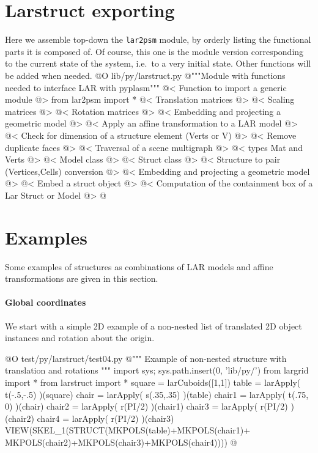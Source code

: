 \documentclass[11pt,oneside]{article}    %
\begin{document}
\section{Larstruct exporting}
\label{sec:larstruct}
Here we assemble top-down the \texttt{lar2psm} module, by orderly listing the functional parts it is composed of. Of course, this one is the module version corresponding to the current state of the system, i.e.~to a very initial state. Other functions will be added when needed.
@O lib/py/larstruct.py
@{"""Module with functions needed to interface LAR with pyplasm"""
@< Function to import a generic module @>
from lar2psm import *
@< Translation matrices @>
@< Scaling matrices @>
@< Rotation matrices @>
@< Embedding and projecting a geometric model @>
@< Apply an affine transformation to a LAR model @>
@< Check for dimension of a structure element (Verts or V) @>
@< Remove duplicate faces @>
@< Traversal of a scene multigraph @>
@< types Mat and Verts @>
@< Model class @>
@< Struct class @>
@< Structure to pair (Vertices,Cells) conversion @>
@< Embedding and projecting a geometric model @>
@< Embed a struct object @>
@< Computation of the containment box of a Lar Struct or Model @>
@}

\section{Examples}
Some examples of structures as combinations of LAR models and affine transformations are given in this section. 

\paragraph{Global coordinates}
We start with a simple 2D example of a non-nested list of translated 2D object instances and rotation about the origin.

@O test/py/larstruct/test04.py
@{""" Example of non-nested structure with translation and rotations """
import sys; sys.path.insert(0, 'lib/py/')
from largrid import *
from larstruct import *
square = larCuboids([1,1])
table = larApply( t(-.5,-.5) )(square)
chair = larApply( s(.35,.35) )(table)
chair1 = larApply( t(.75, 0) )(chair)
chair2 = larApply( r(PI/2) )(chair1)
chair3 = larApply( r(PI/2) )(chair2)
chair4 = larApply( r(PI/2) )(chair3)
VIEW(SKEL_1(STRUCT(MKPOLS(table)+MKPOLS(chair1)+
                   MKPOLS(chair2)+MKPOLS(chair3)+MKPOLS(chair4))))
@}
\end{document}
